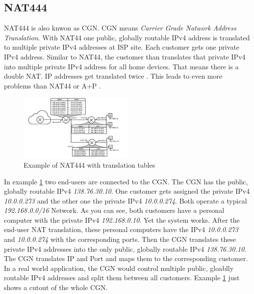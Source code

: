 \documentclass[format=sigconf, natbib=true, nonacm=true]{acmart}
\begin{document}
    \subsection{NAT444}
    NAT444 is also knwon as CGN. CGN means \textit{Carrier Grade Natwork Address Translation}. With NAT44 one public, globally routable IPv4 address is translated to multiple private IPv4 addresses at ISP site. Each customer gets one private IPv4 address. Similar to NAT44, the customer than translates that private IPv4 into multiple private IPv4 address for all home devices. That means there is a double NAT. IP addresses get translated twice \cite{10.1145/2987443.2987474}. This leads to even more problems than NAT44 or A+P \cite{8716482}.
    \begin{figure}
        \centering
        \includegraphics[width=0.5\textwidth]{images/nat_444.png}
        \caption{Example of NAT444 with translation tables}
        \label{fig:nat_444}
    \end{figure}
    In example \ref{fig:nat_444} two end-users are connected to the CGN. The CGN has the public, globally routable IPv4 \textit{138.76.30.10}. One customer gets assigned the private IPv4 \textit{10.0.0.273} and the other one the private IPv4 \textit{10.0.0.274}. Both operate a typical \textit{192.168.0.0/16} Network. As you can see, both customers have a personal computer with the private IPv4 \textit{192.168.0.10}. Yet the system works. After the end-user NAT translation, these personal computers have the IPv4 \textit{10.0.0.273} and \textit{10.0.0.274} with the corresponding ports. Then the CGN translates these private IPv4 addresses into the only public, globally routable IPv4 \textit{138.76.30.10}. The CGN translates IP and Port and maps them to the corresponding customer. In a real world application, the CGN would control multiple public, gloablly routable IPv4 addresses and split them between all customers. Example \ref{fig:nat_444} just shows a cutout of the whole CGN.
\end{document}
